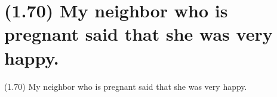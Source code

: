 \documentclass{article}
\begin{document}
\clearpage

%
%

\section*{(1.70) My neighbor who is pregnant said that she was very happy.}

\bigbreak
\begin{enumerate*}
\item[(1.70)] My neighbor who is pregnant said that she was very happy.
\end{enumerate*}
\bigbreak
\end{document}
